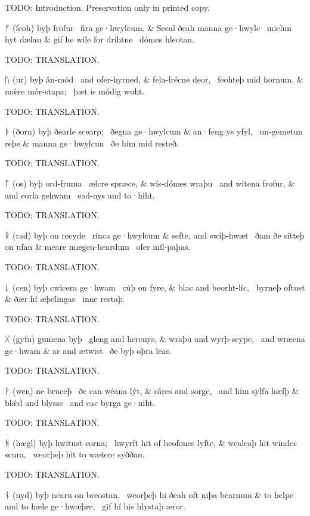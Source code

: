 TODO: Introduction.  Preservation only in printed copy.

\sectionline


\bvg\bva%
ᚠ (feoh) byþ frofur \hld\ fira ge·hwylcum. &
Sceal ðeah manna ge·hwylc \hld\ miclun hyt dælan &
gif he wile for drihtne \hld\ dómes hleotan.\eva

\bvb TODO: TRANSLATION.\evb\evg


\bvg\bva%
ᚢ (ur) byþ ân-mód \hld\ and ofer-hyrned, &
fela-frécne deor, \hld\ feohteþ mid hornum, &
mǽre mór-stapa; \hld\ þæt is módig wuht.\eva

\bvb TODO: TRANSLATION.\evb\evg


\bvg\bva%
ᚦ (ðorn) byþ ðearle scearp; \hld\ ðegna ge·hwylcum &
an·feng ys yfyl, \hld\ un-gemetun reþe &
manna ge·hwylcun \hld\ ðe him mid resteð.\eva

\bvb TODO: TRANSLATION.\evb\evg


\bvg\bva%
ᚩ (os) byþ ord-fruma \hld\ ælcre spræce, &
wís-dómes wraþu \hld\ and witena frofur, &
and eorla gehwam \hld\ ead-nys and to·hiht.\eva

\bvb TODO: TRANSLATION.\evb\evg


\bvg\bva%
ᚱ (rad) byþ on recyde \hld\ rinca ge·hwylcum &
sefte, and swiþ-hwæt \hld\ ðam ðe sitteþ on ufan &
meare mægen-heardum \hld\ ofer míl-paþas.\eva

\bvb TODO: TRANSLATION.\evb\evg


\bvg\bva%
ᚳ (cen) byþ cwicera ge·hwam \hld\ cu̇þ on fyre, &
blac and beorht-líc, \hld\ byrneþ oftust &
ðær hí æþelingas \hld\ inne restaþ.\eva

\bvb TODO: TRANSLATION.\evb\evg


\bvg\bva%
ᚷ (gyfu) gumena byþ \hld\ gleng and herenys, &
wraþu and wyrþ-scype, \hld\ and wræcna ge·hwam &
ar and ætwist \hld\ ðe byþ oþra leas.\eva

\bvb TODO: TRANSLATION.\evb\evg


\bvg\bva%
ᚹ (wen) ne bruceþ \hld\ ðe can wéana lýt, &
sâres and sorge, \hld\ and him sylfa hæfþ &
blǽd and blysse \hld\ and eac byrga ge·niht.\eva

\bvb TODO: TRANSLATION.\evb\evg


\bvg\bva%
ᚻ (hægl) byþ hwitust corna; \hld\ hwyrft hit of heofones lyfte, &
wealcaþ hit windes scura, \hld\ weorþeþ hit to wætere syððan.\eva

\bvb TODO: TRANSLATION.\evb\evg


\bvg\bva%
ᚾ (nyd) byþ nearu on breostan, \hld\ weorþeþ hi ðeah oft niþa bearnum &
to helpe and to hæle ge·hwæþre, \hld\ gif hí his hlystaþ æror.\eva

